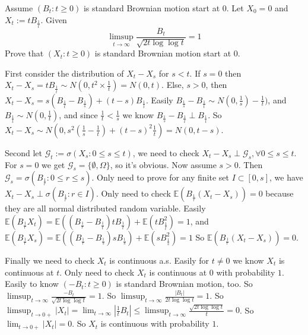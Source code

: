 \documentclass{ctexart}
\begin{document}
\begin{problem}\label{pro:4}
  Assume \((B_t:t \geq 0)\) is standard Brownian motion start at \(0\).
  Let \(X_0=0\) and \(X_t:=t B_{\frac{1}{t}}\).
  Given
  \[
    \limsup_{t \to \infty}\frac{B_{t}}{\sqrt{2t \log \log t}}=1
  \]
  Prove that \((X_t:t \geq 0)\) is standard Brownian motion start at \(0\).
\end{problem}
\begin{solution}
  First consider the distribution of \(X_t-X_s\) for \(s <t\).
  If \(s=0\) then \(X_t-X_s=t B_{\frac{1}{t}} \sim N(0,t^2 \times \frac{1}{t})=N(0,t)\).
  Else, \(s >0\), then \(X_t-X_s =s(B_{\frac{1}{t}}-B_{\frac{1}{s}})+(t-s)B_{\frac{1}{t}}\).
  Easily \(B_{\frac{1}{s}}-B_{\frac{1}{t}} \sim N(0,\frac{1}{s})-\frac{1}{t})\),
  and \(B_{\frac{1}{t}} \sim N(0,\frac{1}{t})\), and since \(\frac{1}{t}<\frac{1}{s}\) we know
  \(B_{\frac{1}{s}}-B_{\frac{1}{t}}\perp B_{\frac{1}{t}}\).
  So \(X_t-X_s \sim N(0,s^2(\frac{1}{s}-\frac{1}{t})+(t-s)^2 \frac{1}{t})=N(0,t-s)\).

  Second let \(\mathcal{G}_t:=\sigma(X_s:0 \leq s \leq t)\),
  we need to check \(X_t-X_s \perp \mathcal{G}_s,\forall 0 \leq s \leq t\).
  For \(s=0\) we get \(\mathcal{G}_s=\{\emptyset,\Omega\}\), so it's obvious.
  Now assume \(s>0\). Then \(\mathcal{G}_s=\sigma(B_{\frac{1}{r}}:0 \leq r \leq s)\).
  Only need to prove for any finite set \(I \subset [0,s]\), we have \(X_t-X_s \perp \sigma(B_{\frac{1}{r}}:r \in I)\).
  Only need to check \(\mathbb{E}(B_{\frac{1}{r}}(X_t-X_s))=0\) because they are all normal distributed random variable.
  Easily \(\mathbb{E}(B_{\frac{1}{r}}X_t)=\mathbb{E}((B_{\frac{1}{r}}-B_{\frac{1}{t}})tB_{\frac{1}{t}})+\mathbb{E}(t B_{\frac{1}{t}}^2)=1\),
  and \(\mathbb{E}(B_{\frac{1}{r}}X_s)=\mathbb{E}((B_{\frac{1}{r}}-B_{\frac{1}{s}})sB_{\frac{1}{s}})+\mathbb{E}(s B_{\frac{1}{s}}^2)=1\)
  So \(\mathbb{E}(B_{\frac{1}{r}}(X_t-X_s))=0\).

  Finally we need to check \(X_t\) is continuous a.s.
  Easily for \(t \neq 0\) we know \(X_t\) is continuous at \(t\).
  Only need to check \(X_t\) is continuous at \(0\) with probability \(1\).
  Easily to know \((-B_t:t \geq 0)\) is standard Brownian motion, too.
  So \(\limsup_{t \to \infty}\frac{-B_t}{\sqrt{2t \log \log t}}=1\).
  So \(\limsup_{t \to \infty}\frac{|B_t|}{2t \log \log t}=1\).
  So \(\limsup_{t \to 0+}|X_t|=\lim_{t \to \infty} |\frac{1}{t}B_{t}| \leq \limsup_{t \to \infty}\frac{\sqrt{2 t \log \log t}}{t}=0\).
  So \(\lim_{t \to 0+}|X_t|=0\).
  So \(X_t\) is continuous with probability \(1\).
\end{solution}
\end{document}
